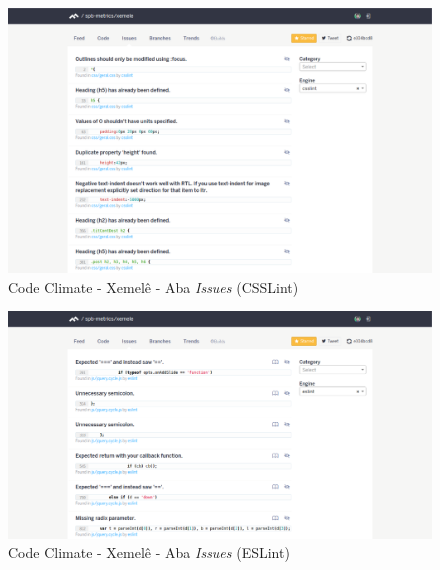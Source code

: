 \newpage

\begin{figure}[!htb]
	\centering
    \includegraphics[keepaspectratio=true,scale=0.35]
    {figuras/codeclimate_issues_tab_csslint.eps}
  \caption{Code Climate - Xemelê - Aba \textit{Issues} (CSSLint)}
	\label{fig:codeclimate_issues_tab_csslint}
\end{figure}

\begin{figure}[!htb]
	\centering
    \includegraphics[keepaspectratio=true,scale=0.35]
    {figuras/codeclimate_issues_tab_eslint.eps}
  \caption{Code Climate - Xemelê - Aba \textit{Issues} (ESLint)}
	\label{fig:codeclimate_issues_tab_eslint}
\end{figure}

\newpage

